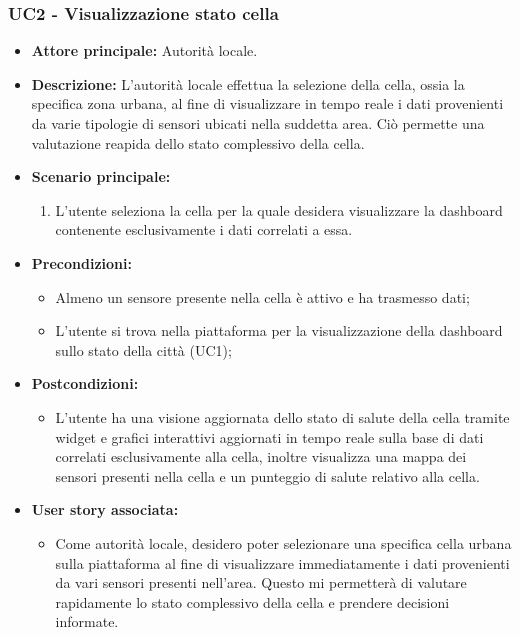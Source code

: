 \subsubsection{UC2 - Visualizzazione stato cella}
\begin{itemize}
    \item \textbf{Attore principale:} Autorità locale.
    \item \textbf{Descrizione:} L'autorità locale effettua la selezione della cella, ossia la specifica zona urbana, al fine di visualizzare in tempo reale i dati provenienti da varie tipologie di sensori ubicati nella suddetta area. Ciò permette una valutazione reapida dello stato complessivo della cella.
    \item \textbf{Scenario principale:}
        \begin{enumerate}
            \item L'utente seleziona la cella per la quale desidera visualizzare la dashboard contenente esclusivamente i dati correlati a essa.
        \end{enumerate}
    \item \textbf{Precondizioni:}
        \begin{itemize}
            \item  Almeno un sensore presente nella cella è attivo e ha trasmesso dati;
            \item L'utente si trova  nella piattaforma per la visualizzazione della dashboard sullo stato della città (UC1);
        \end{itemize}
    \item \textbf{Postcondizioni:}
        \begin{itemize}
            \item  L'utente ha una visione aggiornata dello stato di salute della cella tramite widget e grafici interattivi aggiornati in tempo reale sulla base di dati correlati esclusivamente alla cella, inoltre visualizza una mappa dei sensori presenti nella cella e un punteggio di salute relativo alla cella.
          \end{itemize}
    \item \textbf{User story associata:}
        \begin{itemize}
            \item Come autorità locale, desidero poter selezionare una specifica cella urbana sulla piattaforma al fine di visualizzare immediatamente i dati provenienti da vari sensori presenti nell'area. Questo mi permetterà di valutare rapidamente lo stato complessivo della cella e prendere decisioni informate.
        \end{itemize}
\end{itemize}